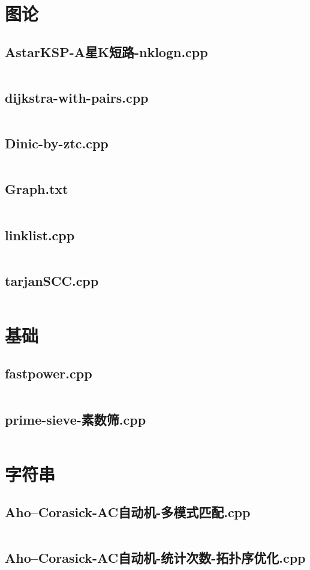 \documentclass[a4paper,landscape,twocolumn]{article} %
\begin{document}
\section{图论}
\subsection{AstarKSP-A星K短路-nklogn.cpp}
\inputminted{c++}{./codes/009}
\subsection{dijkstra-with-pairs.cpp}
\inputminted{c++}{./codes/010}
\subsection{Dinic-by-ztc.cpp}
\inputminted{c++}{./codes/011}
\subsection{Graph.txt}
\inputminted{text}{./codes/012}
\subsection{linklist.cpp}
\inputminted{c++}{./codes/013}
\subsection{tarjanSCC.cpp}
\inputminted{c++}{./codes/014}
\section{基础}
\subsection{fastpower.cpp}
\inputminted{c++}{./codes/015}
\subsection{prime-sieve-素数筛.cpp}
\inputminted{c++}{./codes/016}
\section{字符串}
\subsection{Aho–Corasick-AC自动机-多模式匹配.cpp}
\inputminted{c++}{./codes/017}
\subsection{Aho–Corasick-AC自动机-统计次数-拓扑序优化.cpp}
\inputminted{c++}{./codes/018}
\end{document}
